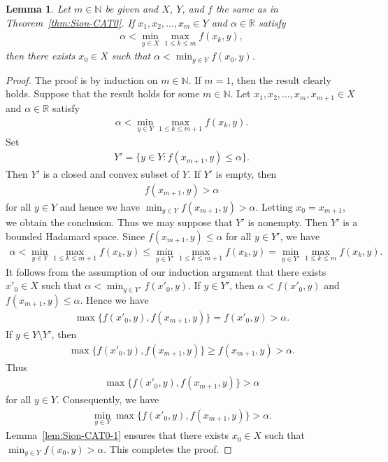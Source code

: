 \documentclass[draft]{amsart}
\numberwithin{equation}{section}
\def\N{\mathbb N}
\def\R{\mathbb R}
\theoremstyle{plain}
\newtheorem{lemma}[theorem]{Lemma}
\theoremstyle{definition}
\theoremstyle{remark}
\begin{document}
\begin{lemma}\label{lem:Sion-CAT0-2}
 Let $m\in \N$ be given and $X$, $Y$, and $f$ 
 the same as in Theorem~\ref{thm:Sion-CAT0}. 
 If 
 $x_1,x_2, \dots , x_m\in Y$ and $\alpha \in \R$ satisfy 
 \begin{align}
  \alpha < \min_{y\in X}\max_{1\leq k\leq m}f(x_k, y), 
 \end{align}
 then there exists $x_0\in X$ such that 
 $\alpha < \min_{y\in Y}f(x_0,y)$. 
\end{lemma}

\begin{proof}
 The proof is by induction on $m\in \N$. 
 If $m=1$, then the result clearly holds. 
 Suppose that the result holds for some $m\in \N$. 
 Let $x_1,x_2, \dots , x_m, x_{m+1}\in X$ and $\alpha \in \R$ satisfy 
 \begin{align}
  \alpha < \min_{y\in Y}\max_{1\leq k\leq m+1}f(x_k, y). 
 \end{align}
 Set 
 \begin{align}
  Y'=\{y\in Y: f(x_{m+1}, y)\leq \alpha\}. 
 \end{align}
 Then $Y'$ is a closed and convex subset of $Y$. 
 If $Y'$ is empty, then 
 \begin{align}
  f(x_{m+1},y) > \alpha
 \end{align}
 for all $y\in Y$ and hence we have 
 $\min_{y\in Y}f(x_{m+1},y)>\alpha$. 
 Letting $x_0=x_{m+1}$, we obtain the conclusion. 
 Thus we may suppose that $Y'$ is nonempty. Then 
 $Y'$ is a bounded Hadamard space. Since 
 $f(x_{m+1},y)\leq \alpha$ for all $y\in Y'$, we have 
 \begin{align}
  \alpha 
 < \min_{y\in Y} \max_{1\leq k\leq m+1} f(x_k,y) 
 \leq \min_{y\in Y'} \max_{1\leq k\leq m+1} f(x_k,y) 
 = \min_{y\in Y'} \max_{1\leq k\leq m} f(x_k,y). 
 \end{align}
 It follows from the assumption of our induction argument that 
 there exists $x'_0\in X$ such that 
 $\alpha < \min_{y\in Y'}f(x'_0,y)$.  
 If $y\in Y'$, then $\alpha < f(x'_0,y)$ and $f(x_{m+1},y)\leq \alpha$. 
 Hence we have 
 \begin{align}
  \max\{f(x'_0,y),f(x_{m+1},y)\} 
 =f(x'_0,y) > \alpha. 
 \end{align}
 If $y\in Y\setminus Y'$, then 
 \begin{align}
  \max\{f(x'_0,y), f(x_{m+1},y)\} \geq f(x_{m+1},y) >\alpha. 
 \end{align}
 Thus 
 \begin{align}
  \max\{f(x'_0,y), f(x_{m+1},y)\} > \alpha
 \end{align}
 for all $y\in Y$. Consequently, we have 
 \begin{align}
  \min_{y\in Y} \max\{f(x'_0,y), f(x_{m+1},y)\} > \alpha. 
 \end{align}
 Lemma~\ref{lem:Sion-CAT0-1} ensures that 
 there exists $x_0\in X$ such that 
 $\min_{y\in Y}f(x_0,y)>\alpha$.  
 This completes the proof. 
\end{proof}
\end{document}

